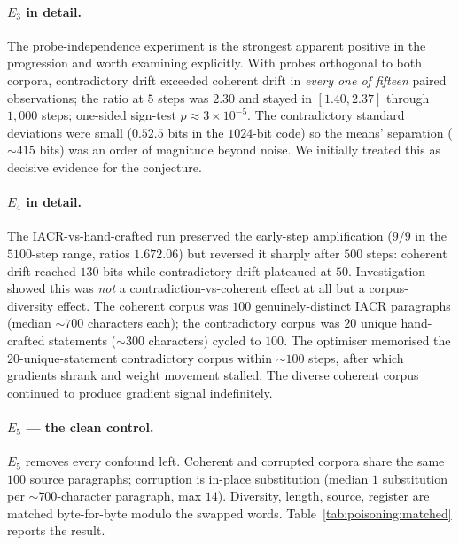 \documentclass[11pt,a4paper]{article}
\begin{document}
\paragraph{$E_3$ in detail.}
The probe\nobreakdash-independence experiment is the strongest
apparent positive in the progression and worth examining
explicitly.  With probes orthogonal to both corpora, contradictory
drift exceeded coherent drift in \emph{every one of fifteen} paired
observations; the ratio at $5$ steps was $2.30$ and stayed in
$[1.40, 2.37]$ through $1{,}000$ steps; one\nobreakdash-sided
sign\nobreakdash-test $p \approx 3 \times 10^{-5}$.  The
contradictory standard deviations were small ($0.5$\textendash$2.5$
bits in the $1024$\nobreakdash-bit code) so the means' separation
($\sim\!4$\textendash$15$ bits) was an order of magnitude beyond
noise.  We initially treated this as decisive evidence for the
conjecture.

\paragraph{$E_4$ in detail.}
The IACR\nobreakdash-vs\nobreakdash-hand\nobreakdash-crafted run
preserved the early\nobreakdash-step amplification ($9/9$ in the
$5$\textendash$100$\nobreakdash-step range, ratios
$1.67$\textendash$2.06$) but reversed it sharply after $500$ steps:
coherent drift reached $130$ bits while contradictory drift
plateaued at $50$.  Investigation showed this was \emph{not} a
contradiction\nobreakdash-vs\nobreakdash-coherent effect at all but
a corpus\nobreakdash-diversity effect.  The coherent corpus was $100$
genuinely\nobreakdash-distinct IACR paragraphs (median $\sim\!700$
characters each); the contradictory corpus was $20$ unique
hand\nobreakdash-crafted statements ($\sim\!300$ characters)
cycled to $100$.  The optimiser memorised the
$20$\nobreakdash-unique\nobreakdash-statement contradictory corpus
within $\sim\!100$ steps, after which gradients shrank and weight
movement stalled.  The diverse coherent corpus continued to produce
gradient signal indefinitely.

\paragraph{$E_5$ — the clean control.}
$E_5$ removes every confound left.  Coherent and corrupted corpora
share the same $100$ source paragraphs; corruption is in\nobreakdash-place
substitution (median $1$ substitution per $\sim\!700$\nobreakdash-character
paragraph, max $14$).  Diversity, length, source, register are
matched byte\nobreakdash-for\nobreakdash-byte modulo the swapped
words.  Table~\ref{tab:poisoning:matched} reports the result.
\end{document}
